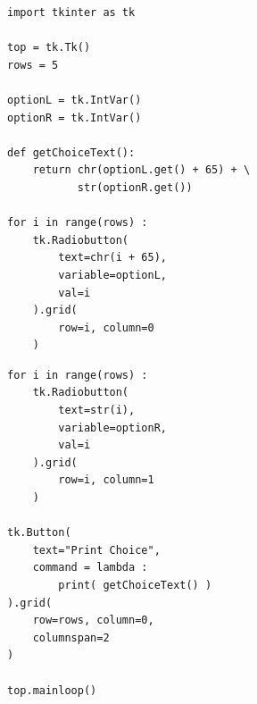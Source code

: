 \begin{frame}[fragile]
%
\begin{tcbraster}[raster columns=2,
                  raster equal height,
                  nobeforeafter,
                  raster column skip=0.5cm]
\begin{codebox}
\begin{verbatim}
import tkinter as tk

top = tk.Tk()
rows = 5

optionL = tk.IntVar()
optionR = tk.IntVar()

def getChoiceText():
    return chr(optionL.get() + 65) + \
           str(optionR.get())

for i in range(rows) :
    tk.Radiobutton(
        text=chr(i + 65),
        variable=optionL,
        val=i
    ).grid(
        row=i, column=0
    )
\end{verbatim}
\end{codebox}
%
\begin{codebox}[... Continued]
\begin{verbatim}
for i in range(rows) :
    tk.Radiobutton(
        text=str(i),
        variable=optionR,
        val=i
    ).grid(
        row=i, column=1
    )

tk.Button(
    text="Print Choice",
    command = lambda :
        print( getChoiceText() )
).grid(
    row=rows, column=0,
    columnspan=2
)

top.mainloop()
\end{verbatim}
\end{codebox}
\end{tcbraster}
%
\end{frame}


